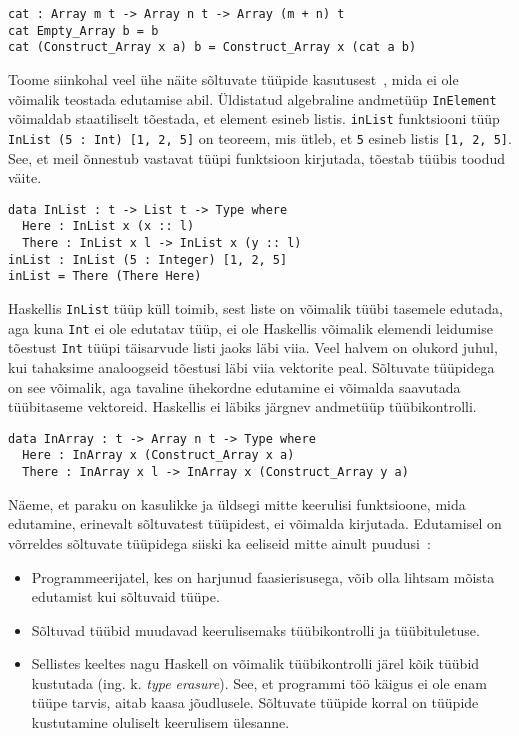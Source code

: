 \documentclass[12pt]{article}
\begin{document}
      \begin{verbatim}cat : Array m t -> Array n t -> Array (m + n) t
cat Empty_Array b = b
cat (Construct_Array x a) b = Construct_Array x (cat a b)\end{verbatim}

      Toome siinkohal veel ühe näite sõltuvate tüüpide kasutusest~\cite{The_Idr}, mida ei ole võimalik teostada edutamise abil. Üldistatud algebraline andmetüüp \verb!InElement! võimaldab staatiliselt tõestada, et element esineb listis. \verb!inList! funktsiooni tüüp \verb!InList (5 : Int) [1, 2, 5]! on teoreem, mis ütleb, et \verb!5! esineb listis \verb![1, 2, 5]!. See, et meil õnnestub vastavat tüüpi funktsioon kirjutada, tõestab tüübis toodud väite.

      \begin{verbatim}data InList : t -> List t -> Type where
  Here : InList x (x :: l)
  There : InList x l -> InList x (y :: l)
inList : InList (5 : Integer) [1, 2, 5]
inList = There (There Here)\end{verbatim}

      Haskellis \verb!InList! tüüp küll toimib, sest liste on võimalik tüübi tasemele edutada, aga kuna \verb!Int! ei ole edutatav tüüp, ei ole Haskellis võimalik elemendi leidumise tõestust \verb!Int! tüüpi täisarvude listi jaoks läbi viia. Veel halvem on olukord juhul, kui tahaksime analoogseid tõestusi läbi viia vektorite peal. Sõltuvate tüüpidega on see võimalik, aga tavaline ühekordne edutamine ei võimalda saavutada tüübitaseme vektoreid. Haskellis ei läbiks järgnev andmetüüp tüübikontrolli.

      \begin{verbatim}data InArray : t -> Array n t -> Type where
  Here : InArray x (Construct_Array x a)
  There : InArray x l -> InArray x (Construct_Array y a)\end{verbatim}

      Näeme, et paraku on kasulikke ja üldsegi mitte keerulisi funktsioone, mida edutamine, erinevalt sõltuvatest tüüpidest, ei võimalda kirjutada. Edutamisel on võrreldes sõltuvate tüüpidega siiski ka eeliseid mitte ainult puudusi~\cite{Giv}:

      \begin{itemize}
        \item
          Programmeerijatel, kes on harjunud faasierisusega, võib olla lihtsam mõista edutamist kui sõltuvaid tüüpe.
        \item
          Sõltuvad tüübid muudavad keerulisemaks tüübikontrolli ja tüübituletuse.
        \item
          Sellistes keeltes nagu Haskell on võimalik tüübikontrolli järel kõik tüübid kustutada (ing. k. \textit{type erasure}). See, et programmi töö käigus ei ole enam tüüpe tarvis, aitab kaasa jõudlusele. Sõltuvate tüüpide korral on tüüpide kustutamine oluliselt keerulisem ülesanne.
      \end{itemize}
\end{document}

